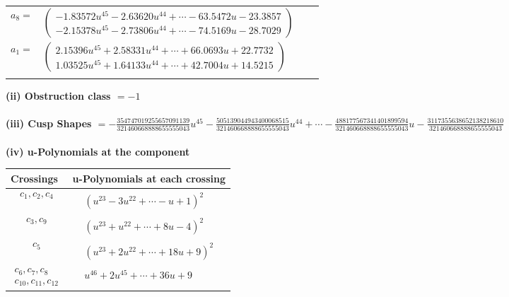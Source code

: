 \documentclass[1p]{elsarticle_modified}
\theoremstyle{definition}
\begin{document}
\begin{tabular}{m{7pt} m{180pt} m{7pt} m{180pt} }
\flushright $a_{8}=$&$\begin{pmatrix}-1.83572 u^{45}-2.63620 u^{44}+\cdots-63.5472 u-23.3857\\-2.15378 u^{45}-2.73806 u^{44}+\cdots-74.5169 u-28.7029\end{pmatrix}$ \\
\flushright $a_{1}=$&$\begin{pmatrix}2.15396 u^{45}+2.58331 u^{44}+\cdots+66.0693 u+22.7732\\1.03525 u^{45}+1.64133 u^{44}+\cdots+42.7004 u+14.5215\end{pmatrix}$\\&\end{tabular}
\flushleft \textbf{(ii) Obstruction class $= -1$}\\~\\
\flushleft \textbf{(iii) Cusp Shapes $= -\frac{354747019255657091139}{321460668888655555043} u^{45}-\frac{505139044943400068515}{321460668888655555043} u^{44}+\cdots-\frac{488177567341401899594}{321460668888655555043} u-\frac{3117355638652138218610}{321460668888655555043}$}\\~\\
\newpage\renewcommand{\arraystretch}{1}
\flushleft \textbf{(iv) u-Polynomials at the component}\newline \\
\begin{tabular}{m{50pt}|m{274pt}}
Crossings & \hspace{64pt}u-Polynomials at each crossing \\
\hline $$\begin{aligned}c_{1},c_{2},c_{4}\end{aligned}$$&$\begin{aligned}
&(u^{23}-3 u^{22}+\cdots- u+1)^{2}
\end{aligned}$\\
\hline $$\begin{aligned}c_{3},c_{9}\end{aligned}$$&$\begin{aligned}
&(u^{23}+u^{22}+\cdots+8 u-4)^{2}
\end{aligned}$\\
\hline $$\begin{aligned}c_{5}\end{aligned}$$&$\begin{aligned}
&(u^{23}+2 u^{22}+\cdots+18 u+9)^{2}
\end{aligned}$\\
\hline $$\begin{aligned}c_{6},c_{7},c_{8}\\c_{10},c_{11},c_{12}\end{aligned}$$&$\begin{aligned}
&u^{46}+2 u^{45}+\cdots+36 u+9
\end{aligned}$\\
\hline
\end{tabular}\\~\\
\end{document}
